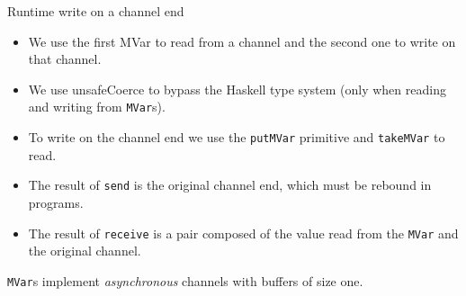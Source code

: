 \documentclass[10pt]{beamer}
\begin{document}
\begin{frame}[fragile]{Runtime \hfill {\color{mLightBrown} write on a channel end}}

\begin{tcolorbox}
\begin{itemize}
        \item We use the first MVar to read from a channel and the second one to write on that channel. \pause
	\item We use unsafeCoerce to bypass the Haskell type system (only when reading and writing from \lstinline|MVar|s). \pause
	\item To write on the channel end we use the \lstinline|putMVar| primitive and \lstinline|takeMVar| to read.\pause
	\item The result of \lstinline|send| is the original channel end, which must be rebound in programs.
        \item The result of \lstinline|receive| is a pair composed of the value read from the \lstinline|MVar| and the original channel.

\end{itemize}
\end{tcolorbox}

\lstinline|MVar|s  implement \emph{asynchronous} channels with
buffers of size one. 


\end{frame}


\end{document}
